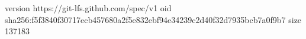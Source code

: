 version https://git-lfs.github.com/spec/v1
oid sha256:f5f3840f30717ecb457680a2f5e832ebf94e34239c2d40f32d7935bcb7a0f9b7
size 137183
